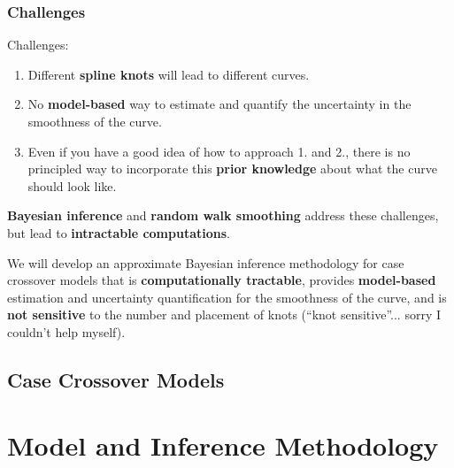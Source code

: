 \documentclass[10pt,usenames,dvipsnames,t]{beamer}
\begin{document}
\begin{frame}
\frametitle{Challenges}

Challenges:
\pause
\begin{enumerate}
\item Different \textbf{spline knots} will lead to different curves.
\pause
\item No \textbf{model-based} way to estimate and quantify the uncertainty in the smoothness of the curve.
\pause
\item Even if you have a good idea of how to approach 1. and 2., there is no principled way to incorporate this \textbf{prior knowledge} about what the curve should look like. 
\end{enumerate}

\pause

\textbf{Bayesian inference} and \textbf{random walk smoothing} address these challenges, but lead to \textbf{intractable computations}.

\pause

We will develop an approximate Bayesian inference methodology for case crossover models that is \textbf{computationally tractable}, \pause provides \textbf{model-based} estimation and uncertainty quantification for the smoothness of the curve, \pause and is \textbf{not sensitive} to the number and placement of knots \pause (``knot sensitive''... sorry I couldn't help myself).

\end{frame}

\subsection{Case Crossover Models}

\section{Model and Inference Methodology}
\end{document}
